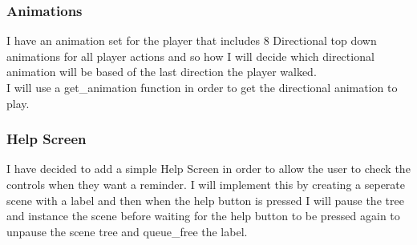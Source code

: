 \documentclass{article}
\begin{document}
        \subsubsection{Animations}
        I have an animation set for the player that includes 8 Directional top down animations for all player actions and so how I will decide which directional animation will be based of the last direction the player walked.\\
        I will use a get\_animation function in order to get the directional animation to play.\\
        \subsubsection{Help Screen}
        I have decided to add a simple Help Screen in order to allow the user to check the controls when they want a reminder. I will implement this by creating a seperate scene with a label and then when the help button is pressed I will pause the tree and instance the scene before waiting for the help button to be pressed again to unpause the scene tree and queue\_free the label.\\
\end{document}
